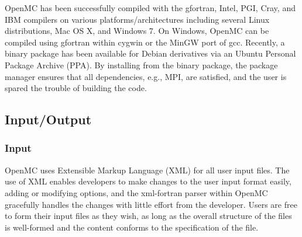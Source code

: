 \documentclass{snamc2013}
\begin{document}
OpenMC has been successfully compiled with the gfortran, Intel, PGI, Cray, and
IBM compilers on various platforms/architectures including several Linux
distributions, Mac OS X, and Windows 7. On Windows, OpenMC can be compiled using
gfortran within cygwin or the MinGW port of gcc. Recently, a binary package has
been available for Debian derivatives via an Ubuntu Personal Package Archive
(PPA). By installing from the binary package, the package manager ensures that
all dependencies, e.g., MPI, are satisfied, and the user is spared the trouble
of building the code.

\subsection{Input/Output}

\subsubsection{Input}

OpenMC uses Extensible Markup Language (XML) for all user input files. The use
of XML enables developers to make changes to the user input format easily,
adding or modifying options, and the xml-fortran parser within OpenMC gracefully
handles the changes with little effort from the developer. Users are free to
form their input files as they wish, as long as the overall structure of the
files is well-formed and the content conforms to the specification of the file.
\end{document}
